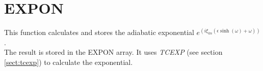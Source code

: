\section{EXPON}
\label{sect:expon}

\noindent This function calculates and stores the adiabatic exponential
$e^{(i \xi_{kn} (\epsilon \sinh(\omega) + \omega))}$.\\

\noindent The result is stored in the EXPON array. It uses {\em TCEXP} (see
section \ref{sect:tcexp}) to calculate the exponential.\\


